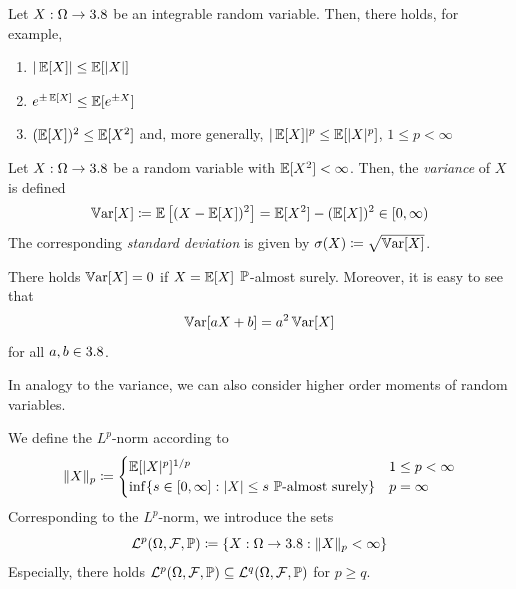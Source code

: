 \begin{example}\label{ex:jensen-examples}
Let $X : \Omega \to 3.8$ be an integrable random variable.
Then, there holds, for example,
\begin{enumerate}
\item
$|\operatorname{\mathbb{E}}[X]| \leq \operatorname{\mathbb{E}}[|X|]$
\item
$e^{\pm\operatorname{\mathbb{E}}[X]} \leq \operatorname{\mathbb{E}}[e^{\pm X}]$
\item
$(\operatorname{\mathbb{E}}[X])^2 \leq \operatorname{\mathbb{E}}[X^2]$ and, more generally, $|\operatorname{\mathbb{E}}[X]|^p \leq \operatorname{\mathbb{E}}[|X|^p]$, $1 \leq p < \infty$
\qedhere
\end{enumerate}
\end{example}

\begin{definition}\label{def:variance}
Let $X : \Omega \to 3.8$ be a random variable with $\operatorname{\mathbb{E}}[X^2]<\infty$.
Then, the \emph{variance} of $X$ is defined 
\begin{equation}\label{eq:variance}
\operatorname{\mathbb{V}ar}[X]
\coloneq
\operatorname{\mathbb{E}}\left[(X-\operatorname{\mathbb{E}}[X])^2\right]
=
\operatorname{\mathbb{E}}[X^2]-(\operatorname{\mathbb{E}}[X])^2
\in [0,\infty)
\end{equation}
The corresponding \emph{standard deviation} is given by
\(
\sigma(X)
\coloneq
\sqrt{\operatorname{\mathbb{V}ar}[X]}
\).
\end{definition}

\begin{remark}\label{rem:variance-affine-transformation}
There holds $\operatorname{\mathbb{V}ar}[X]=0$ if $X=\operatorname{\mathbb{E}}[X]$ $\mathbb{P}$-almost surely.
Moreover, it is easy to see that
\[
\operatorname{\mathbb{V}ar}[aX+b]
=
a^2\operatorname{\mathbb{V}ar}[X]
\]
for all $a,b \in 3.8$.
\end{remark}

In analogy to the variance, we can also consider higher order moments of random variables.

\begin{definition}\label{def:Lp-norm}
We define the $L^p$-norm according to
\begin{equation}\label{eq:Lp-norm}
\|X\|_p
\coloneq
\begin{cases}
\operatorname{\mathbb{E}}[|X|^p]^{1/p} & 1 \leq p < \infty \\
\inf\{s \in [0,\infty] : |X| \leq s \ \mathbb{P}\text{-almost surely}\} & p = \infty
\end{cases}
\end{equation}
Corresponding to the $L^p$-norm, we introduce the sets
\[
\mathcal{L}^p(\Omega,\mathcal{F},\mathbb{P})
\coloneq
\{X : \Omega \to 3.8 : \|X\|_p < \infty\}
\]
Especially, there holds
\(
\mathcal{L}^p(\Omega,\mathcal{F},\mathbb{P})
\subseteq
\mathcal{L}^q(\Omega,\mathcal{F},\mathbb{P})
\)
for $p \geq q$.
\end{definition}

